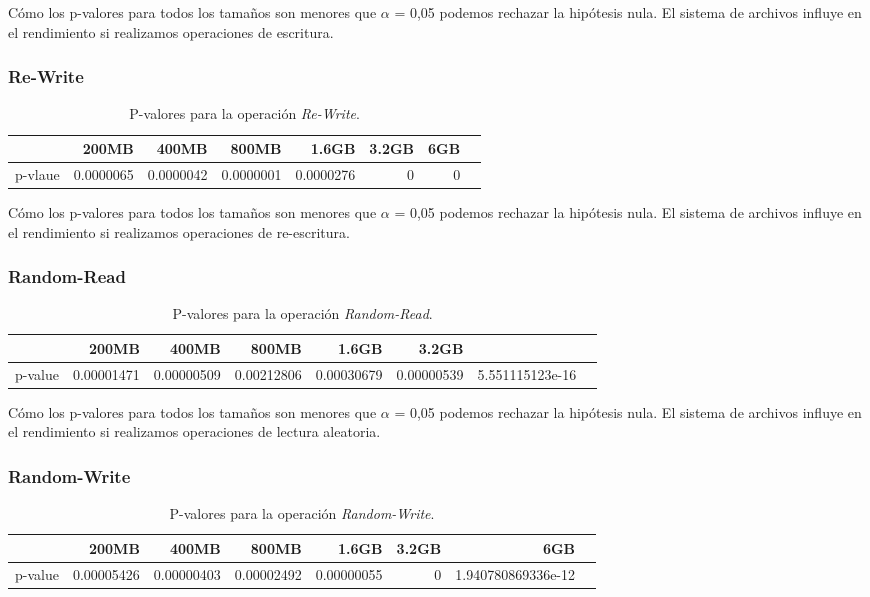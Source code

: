 Cómo los p-valores para todos los tamaños son menores que $\alpha$ = 0,05 podemos rechazar la hipótesis nula. El sistema de archivos influye en el rendimiento si realizamos operaciones de escritura. 
\newpage
\subsubsection{Re-Write}
\begin{table}[!htp]\centering
\scriptsize
\begin{tabular}{lrrrrrrr}\toprule
&200MB &400MB &800MB &1.6GB &3.2GB &6GB \\\midrule
p-vlaue &0.0000065 &0.0000042 &0.0000001 &0.0000276 &0 &0 \\
\bottomrule
\end{tabular}
\caption{P-valores para la operación \textit{Re-Write}.}\label{tab: }
\end{table}

Cómo los p-valores para todos los tamaños son menores que $\alpha$ = 0,05 podemos rechazar la hipótesis nula. El sistema de archivos influye en el rendimiento si realizamos operaciones de re-escritura. 

\subsubsection{Random-Read}
\begin{table}[!htp]\centering
\scriptsize
\begin{tabular}{lrrrrrrr}\toprule
&200MB &400MB &800MB &1.6GB &3.2GB \\\midrule
p-value &0.00001471 &0.00000509 &0.00212806 &0.00030679 &0.00000539 &5.551115123e-16 \\
\bottomrule
\end{tabular}
\caption{P-valores para la operación \textit{Random-Read}.}\label{tab: }
\end{table}

Cómo los p-valores para todos los tamaños son menores que $\alpha$ = 0,05 podemos rechazar la hipótesis nula. El sistema de archivos influye en el rendimiento si realizamos operaciones de lectura aleatoria. 

\subsubsection{Random-Write}
\begin{table}[!htp]\centering
\scriptsize
\begin{tabular}{lrrrrrrr}\toprule
&200MB &400MB &800MB &1.6GB &3.2GB &6GB \\\midrule
p-value &0.00005426 &0.00000403 &0.00002492 &0.00000055 &0 &1.940780869336e-12 \\
\bottomrule
\end{tabular}
\caption{P-valores para la operación \textit{Random-Write}.}\label{tab: }
\end{table}

